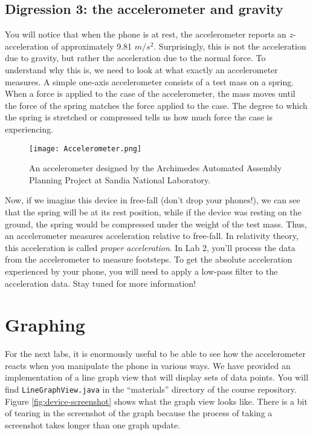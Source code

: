 \documentclass[10pt]{article}
\begin{document}
\subsection{Digression 3: the accelerometer and gravity}
You will notice that when the phone is at rest, the accelerometer reports an $z$-acceleration of approximately 9.81 $m/s^2$. Surprisingly, this is not the acceleration due to gravity, but rather the acceleration due to the normal force. To understand why this is, we need to look at what exactly an accelerometer measures.
A simple one-axis accelerometer consists of a test mass on a spring. When a force is applied to the case of the accelerometer, the mass moves until the force of the spring matches the force applied to the case. The degree to which the spring is stretched or compressed tells us how much force the case is experiencing.
\begin{figure}[h]
\begin{center}\texttt{[image: Accelerometer.png]}\end{center}
\caption{\label{fig:accelerometer}An accelerometer designed by the Archimedes Automated Assembly Planning Project at Sandia National Laboratory.}
\end{figure}
Now, if we imagine this device in free-fall (don't drop your phones!), we can see that the spring will be at its rest position, while if the device was resting on the ground, the spring would be compressed under the weight of the test mass. Thus, an accelerometer measures acceleration relative to free-fall. In relativity theory, this acceleration is called \emph{proper acceleration}.
In Lab 2, you'll process the data from the accelerometer to measure footsteps. To get the absolute acceleration experienced by your phone, you will need to apply a low-pass filter to the acceleration data. Stay tuned for more information!
\section{Graphing}
For the next labs, it is enormously useful to be able to see how the accelerometer reacts when you manipulate the phone in various ways. We have provided an implementation of a line graph view that will display sets of data points. You will find {\tt LineGraphView.java} in the ``materials'' directory of the course repository. Figure \ref{fig:device-screenshot} shows what the graph view looks like. There is a bit of tearing in the screenshot of the graph because the process of taking a screenshot takes longer than one graph update.
\end{document}
